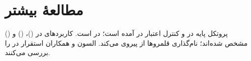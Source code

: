 \documentclass[11pt,a4paper]{article}
\begin{document}
\section{مطالعهٔ بیشتر}
پروتکل پایه در  \cite{rfc6733} و کنترل اعتبار در  \cite{rfc8506} آمده است؛  در
 \cite{rfc2865} است. کاربردهای  در \cite{ts29272} ()، \cite{ts29212}
() و \cite{ts29214} () مشخص شده‌اند؛ نام‌گذاری قلمروها از \cite{ts23003} پیروی می‌کند. السون و همکاران
\cite{olsson2013epc} استقرار  در  را بررسی می‌کنند.

\begin{latin}
\printbibliography[heading=subbibliography,title={References}]
\end{latin}
\end{document}
